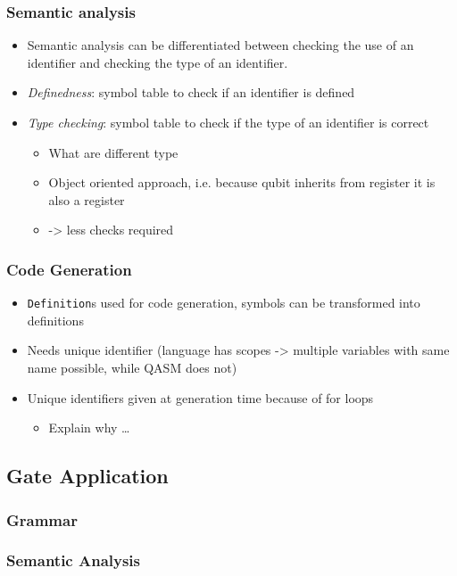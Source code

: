 \subsubsection{Semantic analysis}
\begin{itemize}
    \item Semantic analysis can be differentiated between checking the use of an identifier and checking the type of an identifier.
    \item \emph{Definedness}: symbol table to check if an identifier is defined
    \item \emph{Type checking}: symbol table to check if the type of an identifier is correct
    \begin{itemize}
        \item What are different type 
        \item Object oriented approach, i.e. because qubit inherits from register it is also a register
        \item -> less checks required
    \end{itemize}
\end{itemize}

\subsubsection{Code Generation}
\begin{itemize}
    \item \texttt{Definition}s used for code generation, symbols can be transformed into definitions
    \item Needs unique identifier (language has scopes -> multiple variables with same name possible, while QASM does not)
    \item Unique identifiers given at generation time because of for loops
    \begin{itemize}
        \item Explain why \dots
    \end{itemize}
\end{itemize}

\subsection{Gate Application}
\subsubsection{Grammar}
\subsubsection{Semantic Analysis}
